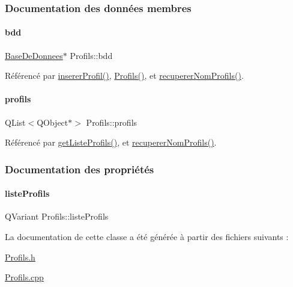 \subsubsection{Documentation des données membres}
\mbox{\label{class_profils_a3703186987f1cd98ec9ca85d43f63fb7}} 
\paragraph{\texorpdfstring{bdd}{bdd}}
{\footnotesize\ttfamily \hyperlink{class_base_de_donnees}{Base\+De\+Donnees}$\ast$ Profils\+::bdd\hspace{0.3cm}{\ttfamily [private]}}



Référencé par \hyperlink{class_profils_ae560041d0af81c5b77a8448d78122d04}{inserer\+Profil()}, \hyperlink{class_profils_abe936fbdac7c189d93aca3fcd8f6c7e6}{Profils()}, et \hyperlink{class_profils_afe85f77aead9a7ea2f09f676d6e2c663}{recuperer\+Nom\+Profils()}.

\mbox{\label{class_profils_ae5de1fe3b6121bec80e3def390b5df15}} 
\paragraph{\texorpdfstring{profils}{profils}}
{\footnotesize\ttfamily Q\+List$<$Q\+Object$\ast$$>$ Profils\+::profils\hspace{0.3cm}{\ttfamily [private]}}



Référencé par \hyperlink{class_profils_aca3d2255478f977eaa84ffa3eea920b1}{get\+Liste\+Profils()}, et \hyperlink{class_profils_afe85f77aead9a7ea2f09f676d6e2c663}{recuperer\+Nom\+Profils()}.



\subsubsection{Documentation des propriétés}
\mbox{\label{class_profils_a0aac746ed598eec04e440e0825a191a1}} 
\paragraph{\texorpdfstring{liste\+Profils}{listeProfils}}
{\footnotesize\ttfamily Q\+Variant Profils\+::liste\+Profils\hspace{0.3cm}{\ttfamily [read]}}



La documentation de cette classe a été générée à partir des fichiers suivants \+:\begin{DoxyCompactItemize}
\item 
\hyperlink{_profils_8h}{Profils.\+h}\item 
\hyperlink{_profils_8cpp}{Profils.\+cpp}\end{DoxyCompactItemize}
